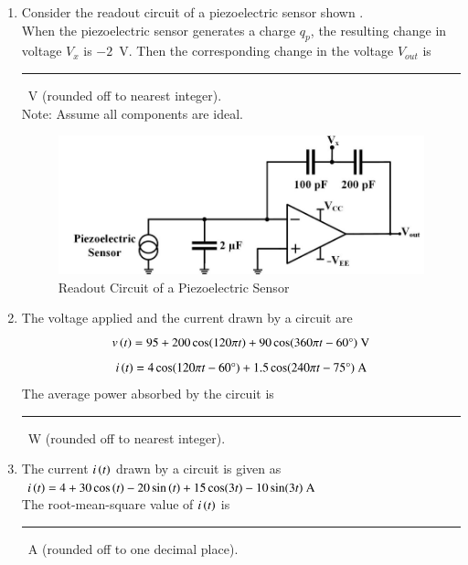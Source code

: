 \documentclass[journal,12pt,onecolumn]{IEEEtran}
\theoremstyle{remark}
\begin{document}
\begin{enumerate}
\item Consider the readout circuit of a piezoelectric sensor shown .\\
When the piezoelectric sensor generates a charge $q_p$, the resulting change in voltage $V_x$ is $-2$~V. Then the corresponding change in the voltage $V_{out}$ is \rule{1.5cm}{0.4pt}~V (rounded off to nearest integer).\\Note: Assume all components are ideal.
\par\hfill{}
\begin{figure}[H]
    \centering
    \includegraphics[width=0.5\columnwidth]{Figs/Q-29.png}
    \caption{Readout Circuit of a Piezoelectric Sensor}
    \label{29}
\end{figure}

\item The voltage applied and the current drawn by a circuit are\\
 $$v\brak{t} = 95 + 200\cos(120\pi t) + 90\cos(360\pi t - 60\degree)\ \text{V}$$
$$i\brak{t} = 4\cos(120\pi t - 60\degree) + 1.5\cos(240\pi t - 75\degree) \ \text{A}$$   
The average power absorbed by the circuit is \rule{1.5cm}{0.4pt}~W (rounded off to nearest integer).
\par\hfill{}

\item The current $i\brak{t}$ drawn by a circuit is given as\\
$i\brak{t} = 4 + 30\cos\brak{t} - 20\sin\brak{t} + 15\cos(3t) - 10\sin(3t)\ \text{A}$\\
The root-mean-square value of $i\brak{t}$ is \rule{1.5cm}{0.4pt}~A (rounded off to one decimal place).
\par\hfill{}


\end{enumerate}
\end{document}
